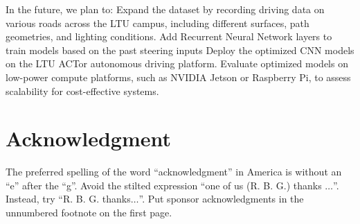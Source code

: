 \documentclass[conference]{IEEEtran}
\begin{document}
In the future, we plan to:
Expand the dataset by recording driving data on various roads across the LTU campus, including different surfaces, path geometries, and lighting conditions.
Add Recurrent Neural Network layers to train models based on the past steering inputs
Deploy the optimized CNN models on the LTU ACTor autonomous driving platform.
Evaluate optimized models on low-power compute platforms, such as NVIDIA Jetson or Raspberry Pi, to assess scalability for cost-effective systems.



\section*{Acknowledgment}


The preferred spelling of the word ``acknowledgment'' in America is without
an ``e'' after the ``g''. Avoid the stilted expression ``one of us (R. B.
G.) thanks $\ldots$''. Instead, try ``R. B. G. thanks$\ldots$''. Put sponsor
acknowledgments in the unnumbered footnote on the first page.

\end{document}
